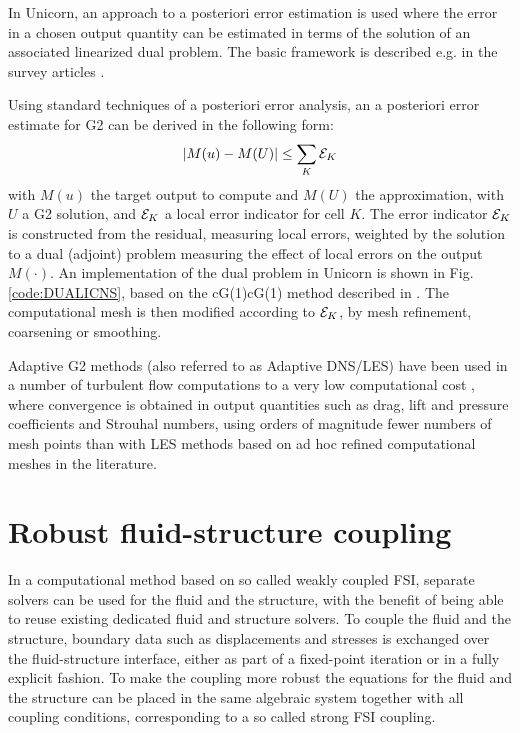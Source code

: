 In Unicorn, an approach to a posteriori error estimation is used where the error in a chosen output quantity can be estimated in terms of the solution of an associated linearized dual problem. The basic framework is described e.g. in the survey articles \cite{ErikssonEstepEtAl1995,BeckerRannacher2001,GilesSuli2002}. 

Using standard techniques of a posteriori error analysis, an a posteriori error estimate for G2 can be derived in the following form: 
\begin{equation}
\vert M(u) - M(U) \vert \leq \sum_K {\cal E}_K
\end{equation}
with $M(u)$ the target output to compute and $M(U)$ the approximation, with $U$ a G2 solution, and ${\cal E}_K$ a local error indicator for cell $K$.
The error indicator ${\cal E}_K$ is constructed from the residual, measuring local errors, 
weighted by the solution to a dual (adjoint) problem measuring the effect of local errors 
on the output $M(\cdot)$. An implementation of the dual problem in Unicorn is shown in Fig.\ref{code:DUALICNS}, based on the cG(1)cG(1) method described in \cite{HoffmanJohnson2007}. The computational mesh is then modified according to $ {\cal E}_K$, by mesh refinement, coarsening or smoothing.

Adaptive G2 methods (also referred to as Adaptive DNS/LES) have been used in a number of turbulent flow computations to a very low computational cost \cite{Hoffman2005,HoffmanJohnson2006b,Hoffman2006,Hoffman2009,HoffmanJansson2009,VilelaJanssonEtAl2010}, where convergence is obtained in output quantities such as drag, lift and pressure coefficients and Strouhal numbers, using orders of magnitude fewer numbers of mesh points than with LES methods based on ad hoc refined computational meshes in the literature. 

\section{Robust fluid-structure coupling}

In a computational method based on so called weakly coupled FSI, separate solvers can be used for the fluid and the structure, with the benefit of being able to reuse existing dedicated fluid and structure solvers. To couple the fluid and the structure, boundary data such as displacements and stresses is exchanged over the fluid-structure interface, either as part of a fixed-point iteration or in a fully explicit fashion. To make the coupling more robust the equations for the fluid and the structure can be placed in the same algebraic system together with all coupling conditions, corresponding to a so called strong FSI coupling. 

